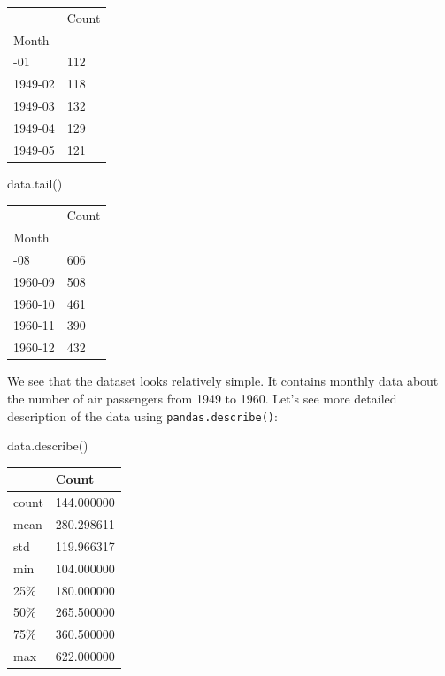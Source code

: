 \documentclass[
  letterpaper,
  DIV=11,
  numbers=noendperiod]{scrartcl}
\newenvironment{Shaded}{\begin{snugshade}}{\end{snugshade}}
\newcommand{\NormalTok}[1]{\textcolor[rgb]{0.00,0.23,0.31}{#1}}
\begin{document}
\begin{longtable}[]{@{}ll@{}}
\toprule\noalign{}
& Count \\
Month & \\
\midrule\noalign{}
\endhead
\bottomrule\noalign{}
\endlastfoot
1949-01 & 112 \\
1949-02 & 118 \\
1949-03 & 132 \\
1949-04 & 129 \\
1949-05 & 121 \\
\end{longtable}

\begin{Shaded}
\begin{Highlighting}[]
\NormalTok{data.tail()}
\end{Highlighting}
\end{Shaded}

\begin{longtable}[]{@{}ll@{}}
\toprule\noalign{}
& Count \\
Month & \\
\midrule\noalign{}
\endhead
\bottomrule\noalign{}
\endlastfoot
1960-08 & 606 \\
1960-09 & 508 \\
1960-10 & 461 \\
1960-11 & 390 \\
1960-12 & 432 \\
\end{longtable}

We see that the dataset looks relatively simple. It contains monthly
data about the number of air passengers from 1949 to 1960. Let's see
more detailed description of the data using \texttt{pandas.describe()}:

\begin{Shaded}
\begin{Highlighting}[]
\NormalTok{data.describe()}
\end{Highlighting}
\end{Shaded}

\begin{longtable}[]{@{}ll@{}}
\toprule\noalign{}
& Count \\
\midrule\noalign{}
\endhead
\bottomrule\noalign{}
\endlastfoot
count & 144.000000 \\
mean & 280.298611 \\
std & 119.966317 \\
min & 104.000000 \\
25\% & 180.000000 \\
50\% & 265.500000 \\
75\% & 360.500000 \\
max & 622.000000 \\
\end{longtable}
\end{document}
